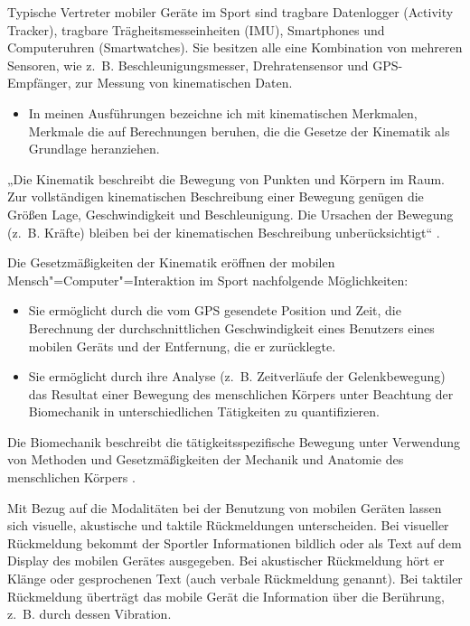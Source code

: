 Typische Vertreter mobiler Geräte im Sport sind tragbare Datenlogger (Activity Tracker), tragbare Trägheitsmesseinheiten (\ac{IMU}), Smartphones und Computeruhren (Smartwatches). Sie besitzen alle eine Kombination von mehreren Sensoren, wie z.~B. Beschleunigungsmesser, Drehratensensor und \acs{GPS}-Empfänger, zur Messung von kinematischen Daten. 
\begin{itemize}
	
	\item In meinen Ausführungen bezeichne ich mit kinematischen Merkmalen, Merkmale die auf Berechnungen beruhen, die die Gesetze der Kinematik als Grundlage heranziehen. 
\end{itemize}

„Die Kinematik beschreibt die Bewegung von Punkten und Körpern im Raum. Zur vollständigen kinematischen Beschreibung einer Bewegung genügen die Größen Lage, Geschwindigkeit und Beschleunigung. Die Ursachen der Bewegung (z.~B. Kräfte) bleiben bei der kinematischen Beschreibung unberücksichtigt“ \citep[][S.~57]{Disselhorst-Klug2015}.

Die Gesetzmäßigkeiten der Kinematik eröffnen der mobilen Mensch"=Computer"=Interaktion im Sport nachfolgende Möglichkeiten: 
\begin{itemize}
	\item Sie ermöglicht durch die vom \acs{GPS} gesendete Position und Zeit, die Berechnung der durchschnittlichen Geschwindigkeit eines Benutzers eines mobilen Geräts und der Entfernung, die er zurücklegte. 
	\item Sie ermöglicht durch ihre Analyse (z.~B. Zeitverläufe der Gelenkbewegung) das Resultat einer Bewegung des menschlichen Körpers unter Beachtung der Biomechanik in unterschiedlichen Tätigkeiten zu quantifizieren. 
\end{itemize}

Die Biomechanik beschreibt die tätigkeitsspezifische Bewegung unter Verwendung von Methoden und Gesetzmäßigkeiten der Mechanik und Anatomie des menschlichen Körpers \citep[][S.~2ff.]{Winter2009}.

Mit Bezug auf die Modalitäten bei der Benutzung von mobilen Geräten lassen sich visuelle, akustische und taktile Rückmeldungen unterscheiden. Bei visueller Rückmeldung bekommt der Sportler Informationen bildlich oder als Text auf dem Display des mobilen Gerätes ausgegeben. Bei akustischer Rückmeldung hört er Klänge oder gesprochenen Text (auch verbale Rückmeldung genannt). Bei taktiler Rückmeldung überträgt das mobile Gerät die Information über die Berührung, z.~B. durch dessen Vibration.

